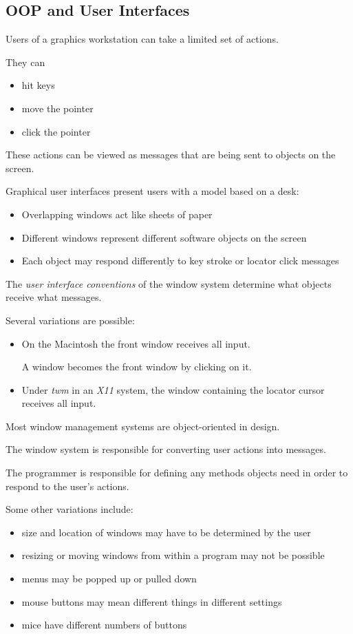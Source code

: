 \begin{slide}{}
\section{OOP and User Interfaces}
Users of a graphics workstation can take a limited set of actions.

They can
\begin{itemize}
\item hit keys
\item move the pointer
\item click the pointer
\end{itemize}
These actions can be viewed as messages that are being sent to
objects on the screen.

Graphical user interfaces present users with a model based on a desk:
\begin{itemize}
\item
Overlapping windows act like sheets of paper
\item
Different windows represent different software objects on the screen
\item
Each object may respond differently to key stroke or locator click
messages
\end{itemize}
\end{slide}

\begin{slide}{}
The {\em user interface conventions} of the window system
determine what objects receive what messages.

Several variations are possible:
\begin{itemize}
\item
On the Macintosh the front window receives all input.

A window becomes the front window by clicking on it.
\item
Under {\em twm}\/ in an {\em X11}\/ system, the window containing the
locator cursor receives all input.
\end{itemize}
Most window management systems are object-oriented in design.

The window system is responsible for converting user actions into
messages.

The programmer is responsible for defining any methods objects
need in order to respond to the user's actions.
\end{slide}

\begin{slide}{}
Some other variations include:
\begin{itemize}
\item
size and location of windows may have to be determined by the user
\item
resizing or moving windows from within a program may not be possible
\item
menus may be popped up or pulled down
\item
mouse buttons may mean different things in different settings
\item
mice have different numbers of buttons
\end{itemize}
\end{slide}

